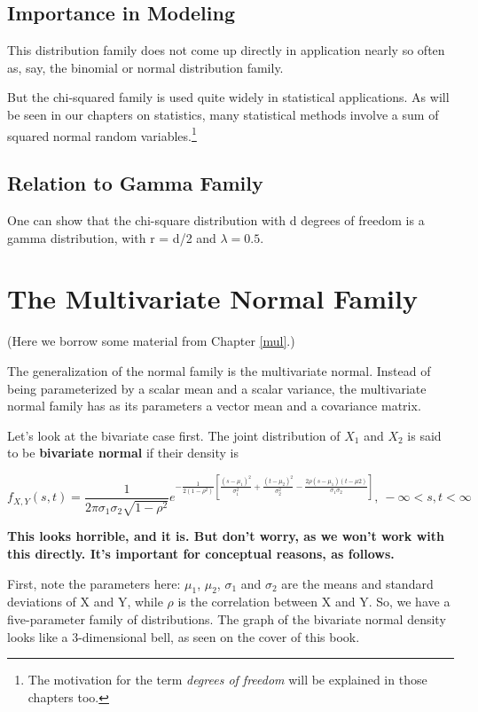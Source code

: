 \subsection{Importance in Modeling}

This distribution family does not come up directly in application nearly
so often as, say, the binomial or normal distribution family.

But the chi-squared family is used quite widely in statistical
applications.  As will be seen in our chapters on statistics, many
statistical methods involve a sum of squared normal random
variables.\footnote{The motivation for the term {\it degrees of freedom}
will be explained in those chapters too.}

\subsection{Relation to Gamma Family}

One can show that the chi-square distribution with d degrees of freedom
is a gamma distribution, with r = d/2 and $\lambda = 0.5$.

\section{The Multivariate Normal Family}

(Here we borrow some material from Chapter \ref{mul}.)

The generalization of the normal family is the multivariate normal.
Instead of being parameterized by a scalar mean and a scalar variance,
the multivariate normal family has as its parameters a vector mean and
a covariance matrix.

Let's look at the bivariate case first.  The joint distribution of
$X_1$ and $X_2$ is said to be {\bf bivariate normal} if their density is

\begin{equation}
f_{X,Y}(s,t) = \frac{1}{2\pi \sigma_1 \sigma_2 \sqrt{1-\rho^2}}
e^
{-\frac{1}{2(1-\rho^2)} 
\left [
\frac{(s-\mu_1)^2}{\sigma_1^2} + \frac{(t-\mu_2)^2}{\sigma_2^2} 
-\frac
{2\rho (s-\mu_1)(t-\mu2)}
{\sigma_1 \sigma_2}
\right ]
}, ~ -\infty < s,t < \infty
\end{equation}

{\bf This looks horrible, and it is.  But don't worry, as we won't work
with this directly.  It's important for conceptual reasons, as follows.}

First, note the parameters here:  $\mu_1$, $\mu_2$, $\sigma_1$ and
$\sigma_2$ are the means and standard deviations of X and Y,
while $\rho$ is the correlation between X and Y.  So, we have a
five-parameter family of distributions.  The graph of the bivariate
normal density looks like a 3-dimensional bell, as seen on the cover of
this book.

